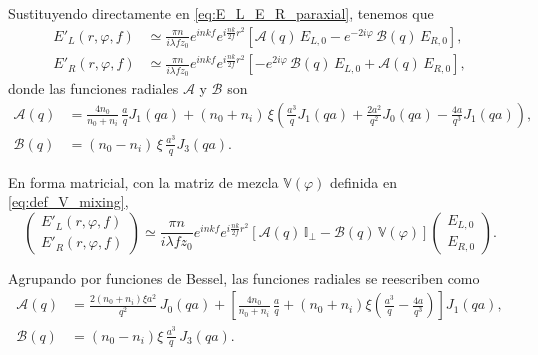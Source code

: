 Sustituyendo directamente en \eqref{eq:E_L_E_R_paraxial}, tenemos que
\begin{equation}
  \begin{aligned}
    E'_L(r,\varphi,f)
    &\simeq
    \frac{\pi n}{i\lambda f z_0}
    e^{inkf}
    e^{i\frac{nk}{2f}r^2}
    \left[
      \mathcal A(q)\,E_{L,0}
      -
      e^{-2i\varphi}\,\mathcal B(q)\,E_{R,0}
    \right],
    \\[0.5em]
    E'_R(r,\varphi,f)
    &\simeq
    \frac{\pi n}{i\lambda f z_0}
    e^{inkf}
    e^{i\frac{nk}{2f}r^2}
    \left[
      -
      e^{2i\varphi}\,\mathcal B(q)\,E_{L,0}
      +
      \mathcal A(q)\,E_{R,0}
    \right],
  \end{aligned}
  \label{eq:EL_ER_constant_E0}
\end{equation}
donde las funciones radiales $\mathcal A$ y $\mathcal B$ son
\begin{equation}
  \begin{aligned}
    \mathcal A(q)
    &=
    \frac{4n_0}{n_0+n_i}\,
    \frac{a}{q}J_1(qa)
    +
    (n_0+n_i)\,\xi
    \left(
      \frac{a^3}{q}J_1(qa)
      +
      \frac{2a^2}{q^2}J_0(qa)
      -
      \frac{4a}{q^3}J_1(qa)
    \right),
    \\[0.5em]
    \mathcal B(q)
    &=
    (n_0-n_i)\,\xi\,
    \frac{a^3}{q}J_3(qa).
  \end{aligned}
  \label{eq:A_B_circular_def}
\end{equation}

En forma matricial, con la matriz de mezcla $\mathbb V(\varphi)$ definida en \eqref{eq:def_V_mixing},
\begin{equation}
  \begin{pmatrix}
    E'_L(r,\varphi,f) \\
    E'_R(r,\varphi,f)
  \end{pmatrix}
  \simeq
  \frac{\pi n}{i\lambda f z_0}
  e^{inkf}
  e^{i\frac{nk}{2f}r^2}
  \left[
    \mathcal A(q)\,\mathbb I_\perp
    -
    \mathcal B(q)\,\mathbb V(\varphi)
  \right]
  \begin{pmatrix}
    E_{L,0} \\
    E_{R,0}
  \end{pmatrix}.
  \label{eq:EL_ER_constant_E0_matrix}
\end{equation}

Agrupando por funciones de Bessel, las funciones radiales se reescriben como
\begin{equation}
  \begin{aligned}
    \mathcal A(q)
    &=
    \frac{2(n_0+n_i)\xi a^2}{q^2}\,J_0(qa)
    +
    \left[
      \frac{4n_0}{n_0+n_i}\,\frac{a}{q}
      +
      (n_0+n_i)\xi
      \left(
        \frac{a^3}{q}
        -
        \frac{4a}{q^3}
      \right)
    \right] J_1(qa),
    \\[0.5em]
    \mathcal B(q)
    &=
    (n_0-n_i)\xi\,\frac{a^3}{q}\,J_3(qa).
  \end{aligned}
  \label{eq:EL_ER_constant_E0_bessel_series}
\end{equation}

